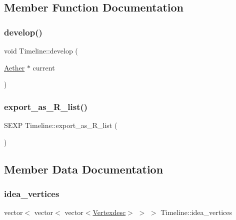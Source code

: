 \subsection{Member Function Documentation}
\mbox{\label{classTimeline_af4e5c180f3615b470a6263ea51f10f84}} 
\subsubsection{\texorpdfstring{develop()}{develop()}}
{\footnotesize\ttfamily void Timeline\+::develop (\begin{DoxyParamCaption}\item[{\hyperlink{classAether}{Aether} $\ast$}]{current }\end{DoxyParamCaption})}

\mbox{\label{classTimeline_a75c810609b7a509757af93a75c3192e9}} 
\subsubsection{\texorpdfstring{export\+\_\+as\+\_\+\+R\+\_\+list()}{export\_as\_R\_list()}}
{\footnotesize\ttfamily S\+E\+XP Timeline\+::export\+\_\+as\+\_\+\+R\+\_\+list (\begin{DoxyParamCaption}{ }\end{DoxyParamCaption})}



\subsection{Member Data Documentation}
\mbox{\label{classTimeline_ab90e68a8988c9cce4d3e258bf4845f50}} 
\subsubsection{\texorpdfstring{idea\+\_\+vertices}{idea\_vertices}}
{\footnotesize\ttfamily vector$<$ vector$<$ vector$<$\hyperlink{Networkland_8h_af340ced64bd0b6914662d1b26be70b41}{Vertexdesc}$>$ $>$ $>$ Timeline\+::idea\+\_\+vertices\hspace{0.3cm}{\ttfamily [private]}}

